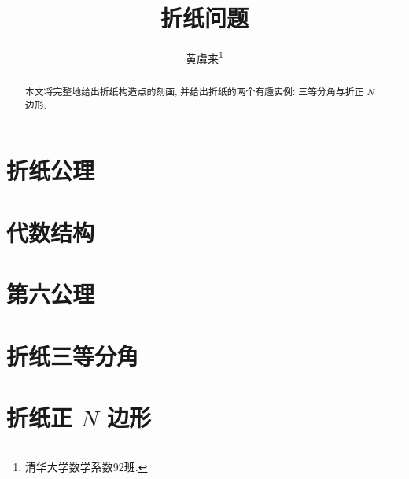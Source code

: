 \documentclass[twoside]{article}
\begin{document}
\title{折纸问题}
\author{黄虞来\footnote{清华大学数学系数92班.}}

\begin{abstract}
    本文将完整地给出折纸构造点的刻画,
    并给出折纸的两个有趣实例: 三等分角与折正 $N$ 边形.
\end{abstract}

\section{折纸公理}



\section{代数结构}



\section{第六公理}



\section{折纸三等分角}



\section{折纸正 \texorpdfstring{$N$}{N} 边形}



\nocite{*}
\printbibliography
\end{document}
